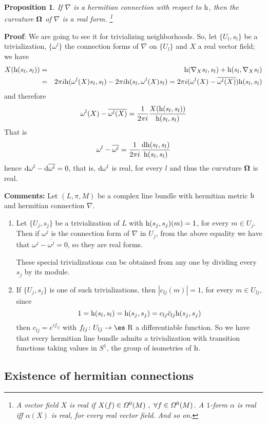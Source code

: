 \documentclass[12pt]{article}
\newtheorem{prop}{Proposition}
\def\beann{\begin{eqnarray*}}
\def\eeann{\end{eqnarray*}}
\def\qed{\ifvmode\removelastskip\fi
{\unskip\nobreak\hfil\penalty50\hbox{}\nobreak\hfil
\hbox{\vrule height1.2ex width1.2ex}\parfillskip=0pt
\finalhyphendemerits=0 \par\smallskip}}
\def\d{{\rm d}}
\def\h{{\rm h}}
\def\curv{{\bf \Omega}}
\def\Real{\mbox{\es R}}
\begin{document}
\begin{prop}
If $\nabla$ is a hermitian connection with respect to $\h$,
then the curvature $\curv $ of $\nabla$ is a real form.%
\footnote{A vector field $X$ is {\it real} if $X(f) \in {\mit\Omega}^0(M) \ ,
\ \forall f \in {\mit\Omega}^0(M)$. A $1$-form $\alpha$ is real iff
$\alpha (X)$ is real, for every real vector field. And so on.
}
\label{cureal}
\end{prop}
{\bf Proof}:  We are going to see it for trivializing
neighborhoods. So, let $\{ U_l,s_l \}$ be a trivialization, $\{
\omega^l  \}$ the connection forms of $\nabla$ on $\{ U_l \}$ and
$X$ a real vector field; we have \beann X(\h (s_l,s_l)) &=& \h
(\nabla_X s_l,s_l) + \h (s_l,\nabla_X s_l)
\\ &=&
2\pi i \h (\omega^l (X)s_l,s_l) - 2\pi i \h (s_l,\omega^l (X)s_l) =
2\pi i (\omega^l (X) - \overline{\omega^l (X)}) \h (s_l,s_l)
\eeann
and therefore
$$
\omega^l (X) - \overline{\omega^l (X)} =
\frac{1}{2\pi i} \frac{X(\h (s_l,s_l))}{\h (s_l,s_l)}
$$
That is
$$
\omega^l  - \overline{\omega^l } =
\frac{1}{2\pi i} \frac{\d \h (s_l,s_l)}{\h (s_l,s_l)}
$$
hence $\d\omega^l  - \d\overline{\omega^l } =0$,
that is, $\d\omega^l $ is real,
for every $l$ and thus the curvature $\curv$ is real.
\qed
%
{\bf Comments:}
Let $(L,\pi ,M)$ be a complex line bundle
with hermitian metric $\h$ and hermitian connection $\nabla$.
\begin{enumerate}
\item
Let $\{ U_j,s_j \}$ be a trivialization of $L$ with
$\h (s_j,s_j)(m) = 1$, for every $m \in U_j$.
Then if $\omega^j$ is the connection form of $\nabla$ in $U_j$,
from the above equality we have that
$\omega^j - \overline{\omega^j} = 0$,
so they are real forms.

These special trivializations can be obtained from any one
by dividing every $s_j$ by its module.
\item
If $\{ U_j,s_j \}$ is one of such trivializations,
then $|c_{l j}(m)|=1$, for every $m \in U_{l j}$, since
$$
1 = \h (s_l,s_l) = \h (s_j,s_j) = c_{l j} \bar c_{l j} \h (s_j,s_j)
$$
then $c_{l j} = e^{if_{l j}}$ with $f_{l j} \colon U_{l j} \to \Real$
a differentiable function. So we have that every hermitian line bundle
admits a trivialization with transition functions
taking values in $S^1$, the group of isometries of $\h$.
\end{enumerate}



\subsection{Existence of hermitian connections}
\end{document}
